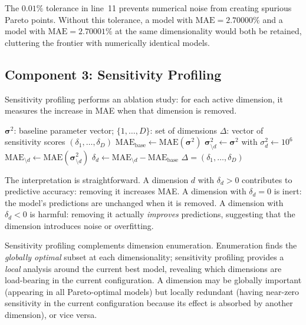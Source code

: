 \documentclass[12pt]{article}
\newcommand{\MAE}{\mathrm{MAE}}
\begin{document}
The $0.01\%$ tolerance in line~11 prevents numerical noise from creating spurious Pareto points.  Without this tolerance, a model with $\MAE = 2.70000\%$ and a model with $\MAE = 2.70001\%$ at the same dimensionality would both be retained, cluttering the frontier with numerically identical models.

\subsection{Component 3: Sensitivity Profiling}

Sensitivity profiling performs an ablation study: for each active dimension, it measures the increase in MAE when that dimension is removed.

\begin{algorithm}[H]
\caption{\textsc{SensitivityProfile}$(\boldsymbol{\sigma}^2, \{1, \ldots, D\})$}
\label{alg:sensitivity}
\begin{algorithmic}[1]
\REQUIRE $\boldsymbol{\sigma}^2$: baseline parameter vector; $\{1, \ldots, D\}$: set of dimensions
\ENSURE $\Delta$: vector of sensitivity scores $(\delta_1, \ldots, \delta_D)$
\STATE $\MAE_{\mathrm{base}} \leftarrow \MAE(\boldsymbol{\sigma}^2)$
    \STATE $\boldsymbol{\sigma}_{\setminus d}^2 \leftarrow \boldsymbol{\sigma}^2$ with $\sigma_d^2 \leftarrow 10^6$ 
    \STATE $\MAE_{\setminus d} \leftarrow \MAE(\boldsymbol{\sigma}_{\setminus d}^2)$
    \STATE $\delta_d \leftarrow \MAE_{\setminus d} - \MAE_{\mathrm{base}}$ 
\ENDFOR
\RETURN $\Delta = (\delta_1, \ldots, \delta_D)$
\end{algorithmic}
\end{algorithm}

The interpretation is straightforward.  A dimension $d$ with $\delta_d > 0$ contributes to predictive accuracy: removing it increases MAE.  A dimension with $\delta_d = 0$ is inert: the model's predictions are unchanged when it is removed.  A dimension with $\delta_d < 0$ is harmful: removing it actually \emph{improves} predictions, suggesting that the dimension introduces noise or overfitting.

Sensitivity profiling complements dimension enumeration.  Enumeration finds the \emph{globally optimal} subset at each dimensionality; sensitivity profiling provides a \emph{local} analysis around the current best model, revealing which dimensions are load-bearing in the current configuration.  A dimension may be globally important (appearing in all Pareto-optimal models) but locally redundant (having near-zero sensitivity in the current configuration because its effect is absorbed by another dimension), or vice versa.
\end{document}
